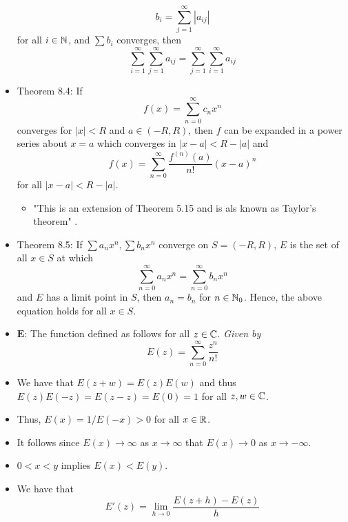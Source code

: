 \documentclass[../notes.tex]{subfiles}
\begin{document}
\begin{itemize}
    \begin{equation*}
        b_i = \sum_{j=1}^\infty|a_{ij}|
    \end{equation*}
    for all $i\in\mathbb{N}$, and $\sum b_i$ converges, then
    \begin{equation*}
        \sum_{i=1}^\infty\sum_{j=1}^\infty a_{ij} = \sum_{j=1}^\infty\sum_{i=1}^\infty a_{ij}
    \end{equation*}
    \item Theorem 8.4: If
    \begin{equation*}
        f(x) = \sum_{n=0}^\infty c_nx^n
    \end{equation*}
    converges for $|x|<R$ and $a\in(-R,R)$, then $f$ can be expanded in a power series about $x=a$ which converges in $|x-a|<R-|a|$ and
    \begin{equation*}
        f(x) = \sum_{n=0}^\infty\frac{f^{(n)}(a)}{n!}(x-a)^n
    \end{equation*}
    for all $|x-a|<R-|a|$.
    \begin{itemize}
        \item "This is an extension of Theorem 5.15 and is als known as Taylor's theorem" \parencite[176]{bib:Rudin}.
    \end{itemize}
    \item Theorem 8.5: If $\sum a_nx^n,\sum b_nx^n$ converge on $S=(-R,R)$, $E$ is the set of all $x\in S$ at which
    \begin{equation*}
        \sum_{n=0}^\infty a_nx^n = \sum_{n=0}^\infty b_nx^n
    \end{equation*}
    and $E$ has a limit point in $S$, then $a_n=b_n$ for $n\in\mathbb{N}_0$. Hence, the above equation holds for all $x\in S$.
    \item $\bm{E}$: The function defined as follows for all $z\in\mathbb{C}$. \emph{Given by}
    \begin{equation*}
        E(z) = \sum_{n=0}^\infty\frac{z^n}{n!}
    \end{equation*}
    \item We have that $E(z+w)=E(z)E(w)$ and thus $E(z)E(-z)=E(z-z)=E(0)=1$ for all $z,w\in\mathbb{C}$.
    \item Thus, $E(x)=1/E(-x)>0$ for all $x\in\mathbb{R}$.
    \item It follows since $E(x)\to\infty$ as $x\to\infty$ that $E(x)\to 0$ as $x\to -\infty$.
    \item $0<x<y$ implies $E(x)<E(y)$.
    \item We have that
    \begin{equation*}
        E'(z) = \lim_{h\to 0}\frac{E(z+h)-E(z)}{h}

\end{equation*}
\end{itemize}
\end{document}
